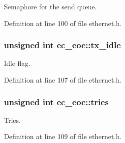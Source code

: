 \-Semaphore for the send queue. 



\-Definition at line 100 of file ethernet.\-h.

\subsubsection[{tx\-\_\-idle}]{\setlength{\rightskip}{0pt plus 5cm}unsigned int {\bf ec\-\_\-eoe\-::tx\-\_\-idle}}\label{structec__eoe_a4f62dfcc5d7d43780af3e2520e66ab74}


\-Idle flag. 



\-Definition at line 107 of file ethernet.\-h.

\subsubsection[{tries}]{\setlength{\rightskip}{0pt plus 5cm}unsigned int {\bf ec\-\_\-eoe\-::tries}}\label{structec__eoe_a94fc1a4085026439575dee3432a8613d}


\-Tries. 



\-Definition at line 109 of file ethernet.\-h.

